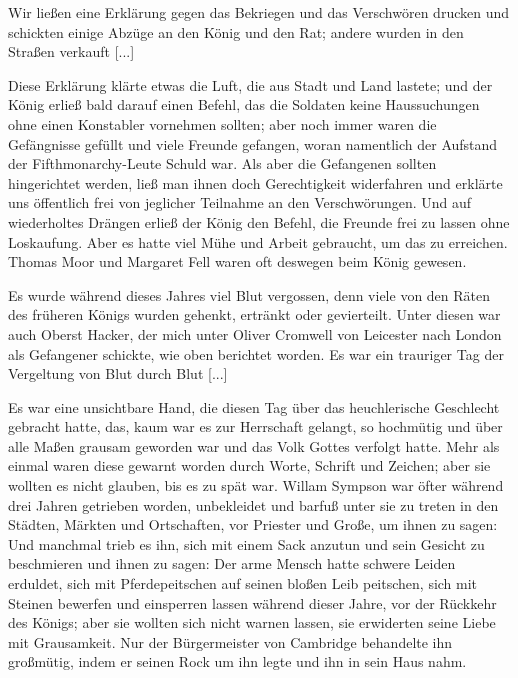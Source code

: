 Wir ließen eine Erklärung gegen das Bekriegen und das
Verschwören drucken und schickten einige Abzüge an den König
und den Rat; andere wurden in den Straßen verkauft [...]

Diese Erklärung klärte etwas die Luft, die aus Stadt und
Land lastete; und der König erließ bald darauf einen Befehl,
das die Soldaten keine Haussuchungen ohne einen Konstabler
vornehmen sollten; aber noch immer waren die Gefängnisse gefüllt
und viele Freunde gefangen, woran namentlich der Aufstand der
Fifthmonarchy-Leute Schuld war. Als aber die Gefangenen
sollten hingerichtet werden, ließ man ihnen doch Gerechtigkeit 
widerfahren und erklärte uns öffentlich frei von jeglicher Teilnahme an
den Verschwörungen. Und auf wiederholtes Drängen erließ der
König den Befehl, die Freunde frei zu lassen ohne Loskaufung.
Aber es hatte viel Mühe und Arbeit gebraucht, um das zu
erreichen. Thomas Moor und Margaret Fell waren oft deswegen
beim König gewesen.

Es wurde während dieses Jahres viel Blut vergossen, denn
viele von den Räten des früheren Königs wurden gehenkt, ertränkt
oder gevierteilt. Unter diesen war auch Oberst Hacker, der mich
unter Oliver Cromwell von 
Leicester nach London als Gefangener
schickte, wie oben berichtet worden. Es war ein trauriger Tag
der Vergeltung von Blut durch Blut [...]

Es war eine unsichtbare Hand, die diesen Tag über das
heuchlerische Geschlecht gebracht hatte, das, kaum war es zur
Herrschaft gelangt, so hochmütig und über alle Maßen grausam
geworden war und das Volk Gottes verfolgt hatte.
Mehr als einmal waren diese  gewarnt worden
durch Worte, Schrift und Zeichen; aber sie wollten es nicht
glauben, bis es zu spät war. Willam Sympson war öfter während
drei Jahren getrieben worden, unbekleidet und barfuß unter sie
zu treten in den Städten, Märkten und Ortschaften, vor Priester
und Große, um ihnen zu sagen:  Und manchmal trieb es ihn, sich mit einem Sack
anzutun und sein Gesicht zu beschmieren und ihnen zu sagen:
 Der arme Mensch hatte schwere Leiden erduldet,
sich mit Pferdepeitschen auf seinen bloßen Leib peitschen, sich mit
Steinen bewerfen und einsperren lassen während dieser Jahre, vor
der Rückkehr des Königs; aber sie wollten sich nicht warnen
lassen, sie erwiderten seine Liebe mit Grausamkeit. Nur der
Bürgermeister von Cambridge behandelte ihn großmütig, indem
er seinen Rock um ihn legte und ihn in sein Haus nahm.

